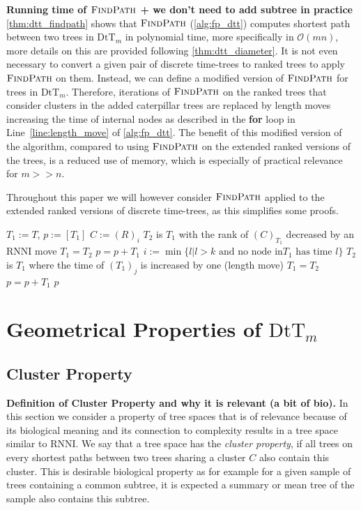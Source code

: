 \documentclass[11pt]{amsart}
\newcommand{\rnni}{\mathrm{RNNI}}
\newcommand{\findpath}{\textsc{FindPath}}
\newcommand{\rank}{\mathrm{rank}}
\newcommand{\dtt}{\mathrm{DtT}}
\renewcommand{\O}{\mathcal O}
\newcommand{\summary}[1]{\textbf{#1}} %
\begin{document}
\summary{Running time of $\findpath$ + we don't need to add subtree in practice}
\autoref{thm:dtt_findpath} shows that $\findpath$ (\autoref{alg:fp_dtt}) computes shortest path between two trees in $\dtt_m$ in polynomial time, more specifically in $\O(mn)$, more details on this are provided following \autoref{thm:dtt_diameter}.
It is not even necessary to convert a given pair of discrete time-trees to ranked trees to apply $\findpath$ on them.
Instead, we can define a modified version of $\findpath$ for trees in $\dtt_m$.
Therefore, iterations of $\findpath$ on the ranked trees that consider clusters in the added caterpillar trees are replaced by length moves increasing the time of internal nodes as described in the \textbf{for} loop in Line~\ref{line:length_move} of \autoref{alg:fp_dtt}.
The benefit of this modified version of the algorithm, compared to using $\findpath$ on the extended ranked versions of the trees, is a reduced use of memory, which is especially of practical relevance for $m >> n$.

Throughout this paper we will however consider $\findpath$ applied to the extended ranked versions of discrete time-trees, as this simplifies some proofs.

\begin{algorithm}[h]
	\caption{$\findpath$($T,R$)}
	\begin{algorithmic}[1]
		\label{alg:fp_dtt}
		\STATE $T_1 := T$, $p := [T_1]$
			\STATE $C:=(R)_i$
			\WHILE {$\rank((C)_{T_1})>k$}
					\STATE $T_2$ is $T_1$ with the rank of $(C)_{T_1}$ decreased by an $\rnni$ move
				\STATE $T_1 = T_2$
				\STATE $p = p+T_1$
			\ENDWHILE
			\ELSE
				\STATE $i := \min\{l | l>k \text{ and no node in} T_1 \text{ has time }l\}$
					\label{line:length_move}
					\STATE $T_2$ is $T_1$ where the time of $(T_1)_j$ is increased by one (length move)
					\STATE $T_1 = T_2$
					\STATE $p = p+T_1$
				\ENDFOR
			\ENDIF
		\ENDFOR
		\RETURN $p$
	\end{algorithmic}
\end{algorithm}


\section{Geometrical Properties of $\dtt_m$}

\subsection{Cluster Property}
\summary{Definition of Cluster Property and why it is relevant (a bit of bio).}
In this section we consider a property of tree spaces that is of relevance because of its biological meaning and its connection to complexity results in a tree space similar to $\rnni$.
We say that a tree space has the \emph{cluster property}, if all trees on every shortest paths between two trees sharing a cluster $C$ also contain this cluster.
This is desirable biological property as for example for a given sample of trees containing a common subtree, it is expected a summary or mean tree of the sample also contains this subtree.
\end{document}
